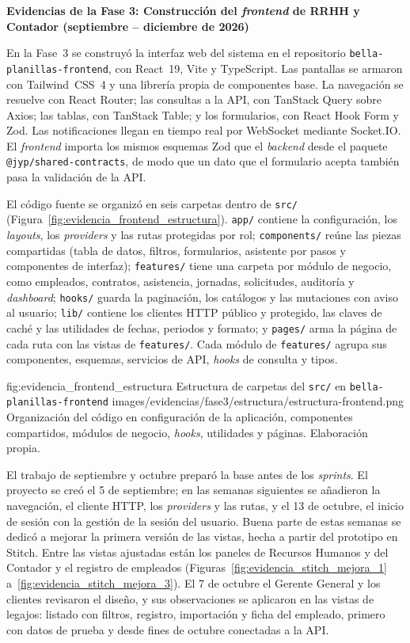 \par\medskip
\noindent\textbf{Evidencias de la Fase 3: Construcción del \textit{frontend} de RRHH y Contador (septiembre – diciembre de 2026)}\par
\nobreak
En la Fase~3 se construyó la interfaz web del sistema en el repositorio \texttt{bella-planillas-\allowbreak frontend}, 
con React~19, Vite y TypeScript. Las pantallas se armaron con Tailwind~CSS~4 y una librería propia de componentes base. 
La navegación se resuelve con React Router; las consultas a la API, con TanStack Query sobre Axios; 
las tablas, con TanStack Table; y los formularios, con React Hook Form y Zod.
Las notificaciones llegan en tiempo real por WebSocket mediante Socket.IO.
El \textit{frontend} importa los mismos esquemas Zod que el \textit{backend} desde el paquete \texttt{@jyp/shared-contracts},
de modo que un dato que el formulario acepta también pasa la validación de la API.

El código fuente se organizó en seis carpetas dentro de \texttt{src/} (Figura~\ref{fig:evidencia_frontend_estructura}).
\texttt{app/} contiene la configuración, los \textit{layouts}, los \textit{providers} y las rutas protegidas por rol;
\texttt{components/} reúne las piezas compartidas (tabla de datos, filtros, formularios, asistente por pasos y componentes de interfaz);
\texttt{features/} tiene una carpeta por módulo de negocio, como empleados, contratos, asistencia, jornadas, solicitudes, auditoría y \textit{dashboard};
\texttt{hooks/} guarda la paginación, los catálogos y las mutaciones con aviso al usuario;
\texttt{lib/} contiene los clientes HTTP público y protegido, las claves de caché y las utilidades de fechas, periodos y formato; 
y \texttt{pages/} arma la página de cada ruta con las vistas de \texttt{features/}.
Cada módulo de \texttt{features/} agrupa sus componentes, esquemas, servicios de API, \textit{hooks} de consulta y tipos.

\figuraEvidencia
    {fig:evidencia_frontend_estructura}
    {Estructura de carpetas del \texttt{src/} en \texttt{bella-planillas-frontend}}
    {images/evidencias/fase3/estructura/estructura-frontend.png}
    {Organización del código en configuración de la aplicación, componentes compartidos, módulos de negocio, \textit{hooks}, utilidades y páginas. Elaboración propia.}

El trabajo de septiembre y octubre preparó la base antes de los \textit{sprints}.
El proyecto se creó el 5 de septiembre; en las semanas siguientes se añadieron la navegación,
el cliente HTTP, los \textit{providers} y las rutas, y el 13 de octubre, el inicio de sesión con la gestión de la sesión del usuario.
Buena parte de estas semanas se dedicó a mejorar la primera versión de las vistas, hecha a partir del prototipo en Stitch. 
Entre las vistas ajustadas están los paneles de Recursos Humanos y del Contador y el registro de empleados 
(Figuras~\ref{fig:evidencia_stitch_mejora_1} a~\ref{fig:evidencia_stitch_mejora_3}).
El 7 de octubre el Gerente General y los clientes revisaron el diseño,
y sus observaciones se aplicaron en las vistas de legajos: listado con filtros, registro, importación y ficha del empleado,
primero con datos de prueba y desde fines de octubre conectadas a la API.


